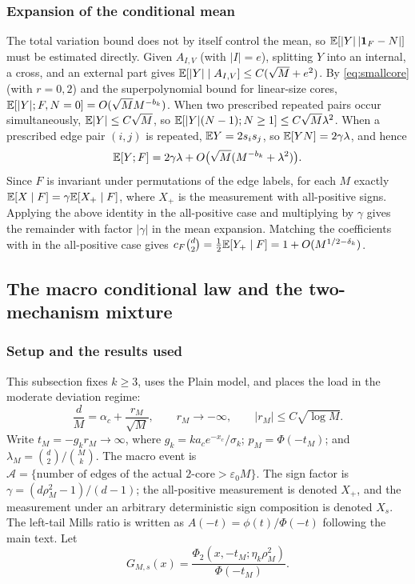 \subsubsection{Expansion of the conditional mean}
The total variation bound does not by itself control the mean, so
$\mathbb E[|Y|\,|\mathbf1_F-N|]$ must be estimated directly. Given $A_{I,V}$ (with $|I|=e$), splitting
$Y$ into an internal, a cross, and an external part gives $\mathbb E[|Y|\mid A_{I,V}]\le C(\sqrt
M+e^2)$. By \eqref{eq:smallcore} (with $r=0,2$) and the superpolynomial bound for linear-size
cores, $\mathbb E[|Y|;F,N=0]=O(\sqrt M M^{-b_k})$. When two prescribed repeated pairs occur
simultaneously, $\mathbb E|Y|\le C\sqrt M$, so $\mathbb E[|Y|(N-1);N\ge1]\le C\sqrt M\lambda^2$. When a
prescribed edge pair $(i,j)$ is repeated, $\mathbb E Y=2s_is_j$, so $\mathbb E[YN]=2\gamma\lambda$, and hence
\begin{equation*}
\mathbb E[Y;F]=2\gamma\lambda+O\bigl(\sqrt M(M^{-b_k}+\lambda^2)\bigr).
\end{equation*}
Since $F$ is invariant under permutations of the edge labels, for each $M$ exactly
$\mathbb E[X\mid F]=\gamma\mathbb E[X_+\mid F]$, where $X_+$ is the measurement with all-positive signs.
Applying the above identity in the all-positive case and multiplying by $\gamma$ gives the
remainder with factor $|\gamma|$ in the mean expansion. Matching the coefficients with
\cite{prior} in the all-positive case gives
$c_F\binom d2=\tfrac12\mathbb E[Y_+\mid F]=1+O(M^{1/2-\delta_k})$.
\subsection{The macro conditional law and the two-mechanism mixture}\label{app:mixture}
\subsubsection{Setup and the results used}

This subsection fixes $k\ge3$, uses the Plain model, and places the load in the moderate
deviation regime:
\begin{equation}
\frac dM=\alpha_c+\frac{r_M}{\sqrt M},\qquad r_M\to-\infty,\qquad |r_M|\le C\sqrt{\log M}.\label{F:range}
\end{equation}
Write $t_M=-g_kr_M\to\infty$, where $g_k=ka_ce^{-x_c}/\sigma_k$;
$p_M=\Phi(-t_M)$; and $\lambda_M=\binom d2/\binom Mk$. The macro event is
$\mathcal A=\{\text{number of edges of the actual 2-core}>\varepsilon_0M\}$. The sign factor is
$\gamma=(d\rho_M^2-1)/(d-1)$; the all-positive measurement is denoted $X_+$, and the measurement
under an arbitrary deterministic sign composition is denoted $X_s$. The left-tail Mills ratio is
written as $A(-t)=\phi(t)/\Phi(-t)$ following the main text. Let
\begin{equation*}
G_{M,s}(x)=\frac{\Phi_2(x,-t_M;\eta_k\rho_M^2)}{\Phi(-t_M)}.
\end{equation*}

